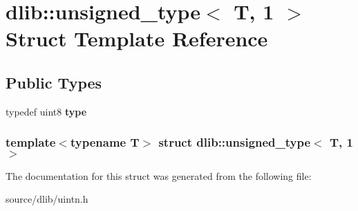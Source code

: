 \hypertarget{structdlib_1_1unsigned__type_3_01T_00_011_01_4}{
\section{dlib::unsigned\_\-type$<$ T, 1 $>$ Struct Template Reference}
\label{structdlib_1_1unsigned__type_3_01T_00_011_01_4}
}
\subsection*{Public Types}
\begin{DoxyCompactItemize}
\item 
\hypertarget{structdlib_1_1unsigned__type_3_01T_00_011_01_4_a760176c4435cb28b5479093c468d7f4d}{
typedef uint8 {\bfseries type}}
\label{structdlib_1_1unsigned__type_3_01T_00_011_01_4_a760176c4435cb28b5479093c468d7f4d}

\end{DoxyCompactItemize}
\subsubsection*{template$<$typename T$>$ struct dlib::unsigned\_\-type$<$ T, 1 $>$}



The documentation for this struct was generated from the following file:\begin{DoxyCompactItemize}
\item 
source/dlib/uintn.h\end{DoxyCompactItemize}
